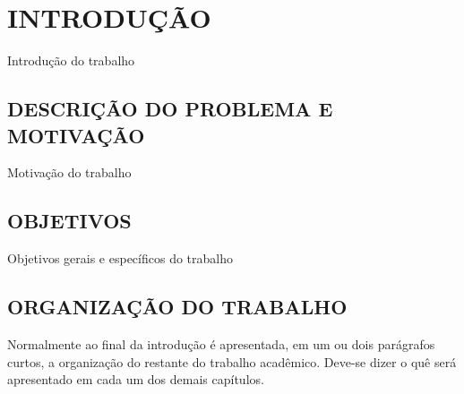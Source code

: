 
\chapter{INTRODUÇÃO}
\label{chap:introducao}
Introdução do trabalho

\section{DESCRIÇÃO DO PROBLEMA E MOTIVAÇÃO}
\label{sec:descricaomotivacao}
Motivação do trabalho

\section{OBJETIVOS}
\label{sec:objetivos}
Objetivos gerais e específicos do trabalho

\section{ORGANIZAÇÃO DO TRABALHO}
\label{sec:organizacaoTrabalho}

Normalmente ao final da introdução é apresentada, em um ou dois parágrafos curtos, a organização do restante do trabalho acadêmico.
Deve-se dizer o quê será apresentado em cada um dos demais capítulos.
